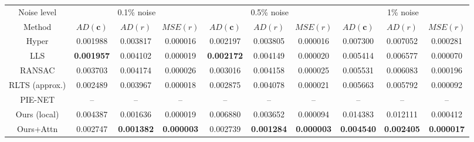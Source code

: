 \documentclass[border=3pt]{standalone}
\begin{document}
\begingroup
\fontsize{10.5}{12}\selectfont
\setlength{\tabcolsep}{6.4pt}
\setlength{\heavyrulewidth}{0.55pt}
\setlength{\lightrulewidth}{0.45pt}
\setlength{\cmidrulewidth}{0.45pt}
\renewcommand{\arraystretch}{0.96}
\begin{tabular}{@{}cccccccccc@{}}
\toprule
Noise level & \multicolumn{3}{c}{0.1\% noise} & \multicolumn{3}{c}{0.5\% noise} & \multicolumn{3}{c}{1\% noise} \\
\cmidrule(l{1pt}r{1pt}){2-4}\cmidrule(l{1pt}r{1pt}){5-7}\cmidrule(l{1pt}r{1pt}){8-10}
Method & $AD(\mathbf{c})$ & $AD(r)$ & $MSE(r)$ & $AD(\mathbf{c})$ & $AD(r)$ & $MSE(r)$ & $AD(\mathbf{c})$ & $AD(r)$ & $MSE(r)$ \\
\midrule
Hyper & 0.001988 & 0.003817 & 0.000016 & 0.002197 & 0.003805 & 0.000016 & 0.007300 & 0.007052 & 0.000281 \\
LLS & \textbf{0.001957} & 0.004102 & 0.000019 & \textbf{0.002172} & 0.004149 & 0.000020 & 0.005414 & 0.006577 & 0.000070 \\
RANSAC & 0.003703 & 0.004174 & 0.000026 & 0.003016 & 0.004158 & 0.000025 & 0.005531 & 0.006083 & 0.000196 \\
RLTS (approx.) & 0.002489 & 0.003967 & 0.000018 & 0.002875 & 0.004078 & 0.000021 & 0.005663 & 0.005792 & 0.000092 \\
PIE-NET & -- & -- & -- & -- & -- & -- & -- & -- & -- \\
Ours (local) & 0.004387 & 0.001636 & 0.000019 & 0.006880 & 0.003652 & 0.000094 & 0.014383 & 0.012111 & 0.000412 \\
Ours+Attn & 0.002747 & \textbf{0.001382} & \textbf{0.000003} & 0.002739 & \textbf{0.001284} & \textbf{0.000003} & \textbf{0.004540} & \textbf{0.002405} & \textbf{0.000017} \\
\bottomrule
\end{tabular}
\endgroup
\end{document}
